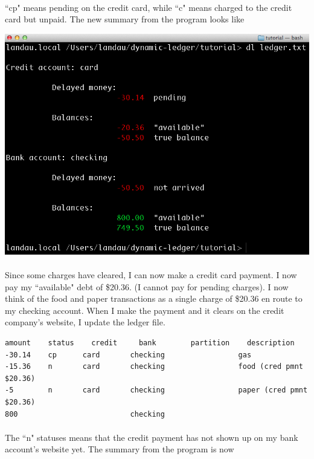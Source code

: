 \documentclass{article}
\providecommand{\q}{$\quad$ \newline}
\begin{document}
\begin{flushleft}
\paragraph{} ``cp" means pending on the credit card, while ``c" means charged to the credit card but unpaid. The new summary from the program looks like \q

\begin{center}
\includegraphics[scale=.45]{fig/sum4.png}
\end{center} 

\paragraph{} Since some charges have cleared, I can now make a credit card payment. I now pay my ``available" debt of \$20.36. (I cannot pay for pending charges). I now think of the food and paper transactions as a single charge of \$20.36 en route to my checking account. When I make the payment and it clears on the credit company's website, I update the ledger file.

\begin{lstlisting}[title=ledger.txt]
amount    status	credit     bank        partition    description
-30.14    cp      card       checking                 gas
-15.36    n       card       checking                 food (cred pmnt $20.36)
-5        n       card       checking                 paper (cred pmnt $20.36)
800                          checking
\end{lstlisting}

\paragraph{} The ``n" statuses means that the credit payment has not shown up on my bank account's website yet. The summary from the program is now \q


\end{flushleft}
\end{document}
